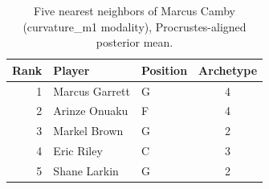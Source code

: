 \begin{table}[htbp]
  \centering\small
  \begin{tabular}{rllc}
    \toprule
    Rank & Player & Position & Archetype \\
    \midrule
    1 & Marcus Garrett & G & 4 \\
    2 & Arinze Onuaku & F & 4 \\
    3 & Markel Brown & G & 2 \\
    4 & Eric Riley & C & 3 \\
    5 & Shane Larkin & G & 2 \\
    \bottomrule
  \end{tabular}
  \caption{Five nearest neighbors of Marcus Camby (curvature_m1 modality), Procrustes-aligned posterior mean.}
  \label{tab:Marcus_Camby_neighbors_curvature_m1}
\end{table}

